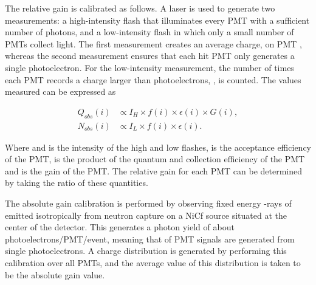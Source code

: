 The relative gain is calibrated as follows. A laser is used to generate two measurements: a high-intensity flash that illuminates every PMT with a sufficient number of photons, and a low-intensity flash in which only a small number of PMTs collect light. The first measurement creates an average charge,  on PMT , whereas the second measurement ensures that each hit PMT only generates a single photoelectron. For the low-intensity measurement, the number of times each PMT records a charge larger than  photoelectrons, , is counted. The values measured can be expressed as

\begin{equation}
  \label{eq:T2KSKExp_RelativeGainCalib}
  \begin{split}
    Q_{obs}(i) &\propto I_{H} \times f(i) \times \epsilon(i) \times G(i), \\
    N_{obs}(i) &\propto I_{L} \times f(i) \times \epsilon(i).
  \end{split}
\end{equation}

Where  and  is the intensity of the high and low flashes,  is the acceptance efficiency of the  PMT,  is the product of the quantum and collection efficiency of the  PMT and  is the gain of the 	PMT. The relative gain for each PMT can be determined by taking the ratio of these quantities.

The absolute gain calibration is performed by observing fixed energy \quickmath{\gamma}-rays of  emitted isotropically from neutron capture on a NiCf source situated at the center of the detector. This generates a photon yield of about  photoelectrons/PMT/event, meaning that  of PMT signals are generated from single photoelectrons. A charge distribution is generated by performing this calibration over all PMTs, and the average value of this distribution is taken to be the absolute gain value.

